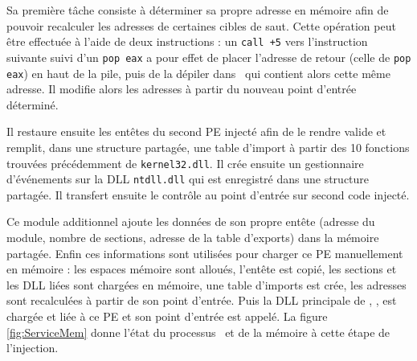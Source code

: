 Sa première tâche consiste à déterminer sa propre adresse en mémoire afin de pouvoir recalculer les adresses de certaines cibles de saut.
Cette opération peut être effectuée à l'aide de deux instructions : un \texttt{call +5} vers l'instruction suivante suivi d'un \texttt{pop eax} a pour effet de placer l'adresse de retour (celle de \texttt{pop eax}) en haut de la pile, puis de la dépiler dans \eax\ qui contient alors cette même adresse.
Il modifie alors les adresses à partir du nouveau point d'entrée déterminé.

Il restaure ensuite les entêtes du second PE injecté afin de le rendre valide et remplit, dans une structure partagée, une table d'import à partir des 10 fonctions trouvées précédemment de \texttt{kernel32.dll}.
Il crée ensuite un gestionnaire d’événements sur la DLL \texttt{ntdll.dll} qui est enregistré dans une structure partagée.
Il transfert ensuite le contrôle au point d'entrée sur second code injecté.

Ce module additionnel ajoute les données de son propre entête (adresse du module, nombre de sections, adresse de la table d'exports) dans la mémoire partagée.
Enfin ces informations sont utilisées pour charger ce PE manuellement en mémoire : les espaces mémoire sont alloués, l'entête est copié, les sections et les DLL liées sont chargées en mémoire, une table d'imports est crée, les adresses sont recalculées à partir de son point d'entrée.
Puis la DLL principale de \duqu, \netpDLL, est chargée et liée à ce PE et son point d'entrée est appelé.
La figure \ref{fig:ServiceMem} donne l'état du processus \services\ et de la mémoire à cette étape de l'injection.


